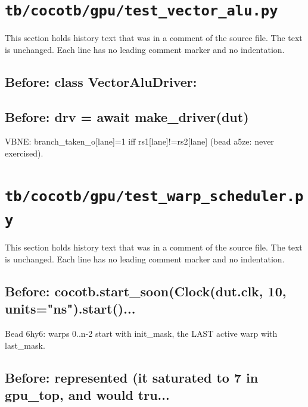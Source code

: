 \section{\texttt{tb/cocotb/gpu/test\_vector\_alu.py}}\label{cr:suite:gpu-test-vector-alu}

This section holds history text that was in a comment of the source file. The text is unchanged. Each line has no leading comment marker and no indentation.

\begin{record}

\subsection*{Before: class VectorAluDriver:}


\subsection*{Before: drv = await make\_driver(dut)}

\begin{textblock}
VBNE: branch_taken_o[lane]=1 iff rs1[lane]!=rs2[lane] (bead a5ze: never exercised).
\end{textblock}

\end{record}

\section{\texttt{tb/cocotb/gpu/test\_warp\_scheduler.py}}\label{cr:suite:gpu-test-warp-scheduler}

This section holds history text that was in a comment of the source file. The text is unchanged. Each line has no leading comment marker and no indentation.

\begin{record}

\subsection*{Before: cocotb.start\_soon(Clock(dut.clk, 10, units="ns").start()...}

\begin{textblock}
Bead 6hy6: warps 0..n-2 start with init_mask, the LAST active warp with last_mask.
\end{textblock}

\subsection*{Before: represented (it saturated to 7 in gpu\_top, and would tru...}


\end{record}

